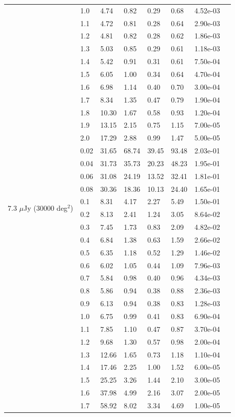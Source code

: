 \documentclass[useAMS,usenatbib]{mn2e}
\begin{document}
\begin{table}
\begin{center}
\begin{tabular}{l|l|l|l|l|lc||r}
& 1.0 &  4.74 & 0.82 & 0.29 & 0.68 & 4.52e-03 \\
& 1.1 &  4.72 & 0.81 & 0.28 & 0.64 & 2.90e-03 \\
& 1.2 &  4.81 & 0.82 & 0.28 & 0.62 & 1.86e-03 \\
& 1.3 &  5.03 & 0.85 & 0.29 & 0.61 & 1.18e-03 \\
& 1.4 &  5.42 & 0.91 & 0.31 & 0.61 & 7.50e-04 \\
& 1.5 &  6.05 & 1.00 & 0.34 & 0.64 & 4.70e-04 \\
& 1.6 &  6.98 & 1.14 & 0.40 & 0.70 & 3.00e-04 \\
& 1.7 &  8.34 & 1.35 & 0.47 & 0.79 & 1.90e-04 \\
& 1.8 &  10.30 & 1.67 & 0.58 & 0.93 & 1.20e-04 \\
& 1.9 &  13.15 & 2.15 & 0.75 & 1.15 & 7.00e-05 \\
& 2.0 &  17.29 & 2.88 & 0.99 & 1.47 & 5.00e-05 \\
\hline
\multirow{10}{*}{ 7.3 $\mu$Jy  (30000 deg$^2$) } 
& 0.02 &  31.65 & 68.74 & 39.45 & 93.48 & 2.03e-01 \\
& 0.04 &  31.73 & 35.73 & 20.23 & 48.23 & 1.95e-01 \\
& 0.06 &  31.08 & 24.19 & 13.52 & 32.41 & 1.81e-01 \\
& 0.08 &  30.36 & 18.36 & 10.13 & 24.40 & 1.65e-01 \\
& 0.1 &  8.31 & 4.17 & 2.27 & 5.49 & 1.50e-01 \\
& 0.2 &  8.13 & 2.41 & 1.24 & 3.05 & 8.64e-02 \\
& 0.3 &  7.45 & 1.73 & 0.83 & 2.09 & 4.82e-02 \\
& 0.4 &  6.84 & 1.38 & 0.63 & 1.59 & 2.66e-02 \\
& 0.5 &  6.35 & 1.18 & 0.52 & 1.29 & 1.46e-02 \\
& 0.6 &  6.02 & 1.05 & 0.44 & 1.09 & 7.96e-03 \\
& 0.7 &  5.84 & 0.98 & 0.40 & 0.96 & 4.34e-03 \\
& 0.8 &  5.86 & 0.94 & 0.38 & 0.88 & 2.36e-03 \\
& 0.9 &  6.13 & 0.94 & 0.38 & 0.83 & 1.28e-03 \\
& 1.0 &  6.75 & 0.99 & 0.41 & 0.83 & 6.90e-04 \\
& 1.1 &  7.85 & 1.10 & 0.47 & 0.87 & 3.70e-04 \\
& 1.2 &  9.68 & 1.30 & 0.57 & 0.98 & 2.00e-04 \\
& 1.3 &  12.66 & 1.65 & 0.73 & 1.18 & 1.10e-04 \\
& 1.4 &  17.46 & 2.25 & 1.00 & 1.52 & 6.00e-05 \\
& 1.5 &  25.25 & 3.26 & 1.44 & 2.10 & 3.00e-05 \\
& 1.6 &  37.98 & 4.99 & 2.16 & 3.07 & 2.00e-05 \\
& 1.7 &  58.92 & 8.02 & 3.34 & 4.69 & 1.00e-05 \\
\hline
\end{tabular}
\label{table:Da_H_0_1_Srms}
\end{center}
\end{table}
\end{document}
